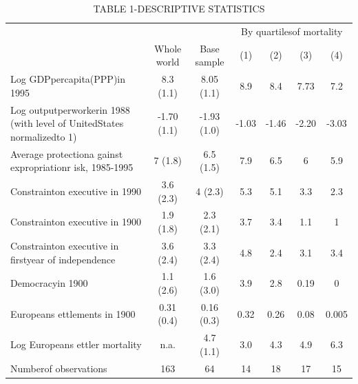 \begin{table}[htbp]
\centering
\caption{TABLE 1-DESCRIPTIVE STATISTICS}
\begin{tabular}{lcccccc}
\hline
 &  &  & \multicolumn{4}{c}{By quartilesof mortality} \\
 & Whole world & Base sample & (1) & (2) & (3) & (4) \\
Log GDPpercapita(PPP)in 1995 & 8.3 (1.1) & 8.05 (1.1) & 8.9 & 8.4 & 7.73 & 7.2 \\
Log outputperworkerin 1988 (with level of UnitedStates normalizedto 1) & -1.70 (1.1) & -1.93 (1.0) & -1.03 & -1.46 & -2.20 & -3.03 \\
Average protectiona gainst expropriationr isk, 1985-1995 & 7 (1.8) & 6.5 (1.5) & 7.9 & 6.5 & 6 & 5.9 \\
Constrainton executive in 1990 & 3.6 (2.3) & 4 (2.3) & 5.3 & 5.1 & 3.3 & 2.3 \\
Constrainton executive in 1900 & 1.9 (1.8) & 2.3 (2.1) & 3.7 & 3.4 & 1.1 & 1 \\
Constrainton executive in firstyear of independence & 3.6 (2.4) & 3.3 (2.4) & 4.8 & 2.4 & 3.1 & 3.4 \\
Democracyin 1900 & 1.1 (2.6) & 1.6 (3.0) & 3.9 & 2.8 & 0.19 & 0 \\
Europeans ettlements in 1900 & 0.31 (0.4) & 0.16 (0.3) & 0.32 & 0.26 & 0.08 & 0.005 \\
Log Europeans ettler mortality & n.a. & 4.7 (1.1) & 3.0 & 4.3 & 4.9 & 6.3 \\
Numberof observations & 163 & 64 & 14 & 18 & 17 & 15 \\
\hline
\end{tabular}
\end{table}
